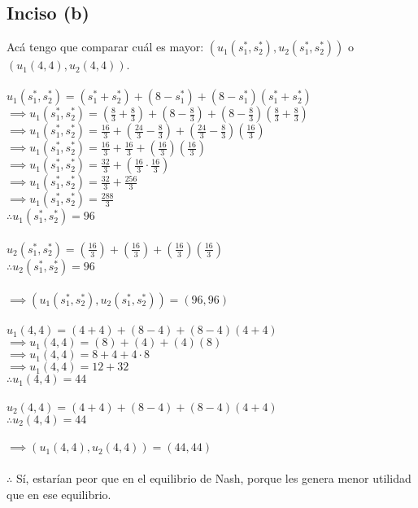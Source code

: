 \documentclass{article}
\begin{document}
        \subsection*{Inciso (b)}
            Acá tengo que comparar cuál es mayor: \((u_{1}(s_{1}^{*}, s_{2}^{*}), u_{2}(s_{1}^{*}, s_{2}^{*}))\) o \((u_{1}(4, 4), u_{2}(4, 4))\). \\
            \\
            \(u_{1}(s_{1}^{*}, s_{2}^{*}) = (s_{1}^{*}+s_{2}^{*})+(8-s_{1}^{*})+(8-s_{1}^{*})(s_{1}^{*}+s_{2}^{*})\) \\
            \(\implies u_{1}(s_{1}^{*}, s_{2}^{*}) = (\frac{8}{3}+\frac{8}{3})+(8-\frac{8}{3})+(8-\frac{8}{3})(\frac{8}{3}+\frac{8}{3})\) \\
            \(\implies u_{1}(s_{1}^{*}, s_{2}^{*}) = \frac{16}{3}+(\frac{24}{3}-\frac{8}{3})+(\frac{24}{3}-\frac{8}{3})(\frac{16}{3})\) \\
            \(\implies u_{1}(s_{1}^{*}, s_{2}^{*}) = \frac{16}{3}+\frac{16}{3}+(\frac{16}{3})(\frac{16}{3})\) \\
            \(\implies u_{1}(s_{1}^{*}, s_{2}^{*}) = \frac{32}{3}+(\frac{16}{3} \cdot \frac{16}{3})\) \\
            \(\implies u_{1}(s_{1}^{*}, s_{2}^{*}) = \frac{32}{3}+\frac{256}{3}\) \\
            \(\implies u_{1}(s_{1}^{*}, s_{2}^{*}) = \frac{288}{3}\) \\
            \(\therefore u_{1}(s_{1}^{*}, s_{2}^{*}) = 96\) \\
            \\
            \(u_{2}(s_{1}^{*}, s_{2}^{*}) = (\frac{16}{3})+(\frac{16}{3})+(\frac{16}{3})(\frac{16}{3})\) \\
            \(\therefore u_{2}(s_{1}^{*}, s_{2}^{*}) = 96\) \\
            \\
            \(\implies (u_{1}(s_{1}^{*}, s_{2}^{*}), u_{2}(s_{1}^{*}, s_{2}^{*})) = (96, 96)\) \\
            \\
            \(u_{1}(4, 4) = (4+4)+(8-4)+(8-4)(4+4)\) \\
            \(\implies u_{1}(4, 4) = (8)+(4)+(4)(8)\) \\
            \(\implies u_{1}(4, 4) = 8+4+4 \cdot 8\) \\
            \(\implies u_{1}(4, 4) = 12+ 32\) \\
            \(\therefore u_{1}(4, 4) = 44\) \\
            \\
            \(u_{2}(4, 4) = (4+4)+(8-4)+(8-4)(4+4)\) \\
            \(\therefore u_{2}(4, 4) = 44\) \\
            \\
            \(\implies (u_{1}(4, 4), u_{2}(4, 4)) = (44, 44)\) \\
            \\
            $\therefore$ Sí, estarían peor que en el equilibrio de Nash, porque les genera menor utilidad que en ese equilibrio.
\end{document}
